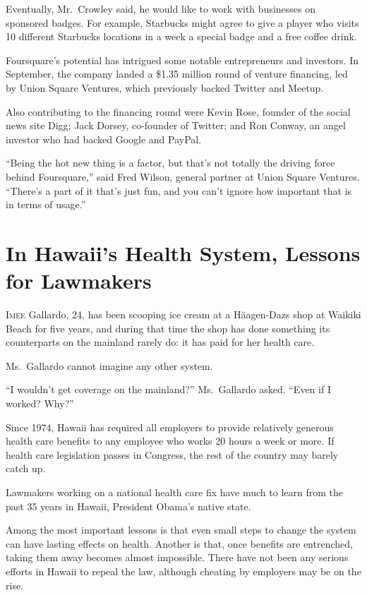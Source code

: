 ﻿\documentclass[12pt]{article}
\begin{document}
Eventually, Mr.~Crowley said, he would like to work with businesses on sponsored badges. For
example, Starbucks might agree to give a player who visits 10 different Starbucks locations in a
week a special badge and a free coffee drink.

Foursquare's potential has intrigued some notable entrepreneurs and investors. In September, the
company landed a \$1.35 million round of venture financing, led by Union Square Ventures, which
previously backed Twitter and Meetup.

Also contributing to the financing round were Kevin Rose, founder of the social news site Digg; Jack
Dorsey, co-founder of Twitter; and Ron Conway, an angel investor who had backed Google and PayPal.

``Being the hot new thing is a factor, but that's not totally the driving force behind Foursquare,''
said Fred Wilson, general partner at Union Square Ventures. ``There's a part of it that's just fun,
and you can't ignore how important that is in terms of usage.''

\section{In Hawaii's Health System, Lessons for Lawmakers}

\lettrine{I}{mee} Gallardo, 24, has been scooping ice cream at a
H\"aagen-Dazs shop at Waikiki Beach for five years, and during that time the shop has done something
its counterparts on the mainland rarely do: it has paid for her health care.

Ms.~Gallardo cannot imagine any other system.

``I wouldn't get coverage on the mainland?'' Ms.~Gallardo asked. ``Even if I worked? Why?''

Since 1974, Hawaii has required all employers to provide relatively generous health care benefits to
any employee who works 20 hours a week or more. If health care legislation passes in Congress, the
rest of the country may barely catch up.

Lawmakers working on a national health care fix have much to learn from the past 35 years in Hawaii,
President Obama's native state.

Among the most important lessons is that even small steps to change the system can have lasting
effects on health. Another is that, once benefits are entrenched\cite{entrench}, taking them away
becomes almost impossible. There have not been any serious efforts in Hawaii to repeal the law,
although cheating by employers may be on the rise.
\end{document}
